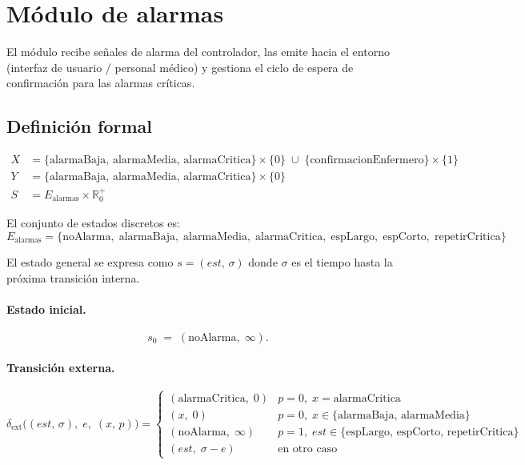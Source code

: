 \documentclass{article}
\newcommand{\dext}{\delta_{\mathrm{ext}}}
\begin{document}
\section{Módulo de alarmas}

El módulo recibe señales de alarma del controlador, las emite hacia el
entorno (interfaz de usuario / personal médico) y gestiona el ciclo de
espera de confirmación para las alarmas críticas.

\subsection{Definición formal}

\begin{align*}
  X &= \{\mathrm{alarmaBaja},\,\mathrm{alarmaMedia},\,\mathrm{alarmaCritica}\}
       \!\times\!\{0\}
     \;\cup\; \{\mathrm{confirmacionEnfermero}\}\!\times\!\{1\} \\[4pt]
  Y &= \{\mathrm{alarmaBaja},\,\mathrm{alarmaMedia},\,\mathrm{alarmaCritica}\}
       \!\times\!\{0\} \\[4pt]
  S &= E_{\mathrm{alarmas}} \times \mathbb{R}_0^+
\end{align*}

El conjunto de estados discretos es:
\[
  E_{\mathrm{alarmas}} = \{
    \mathrm{noAlarma},\;
    \mathrm{alarmaBaja},\;
    \mathrm{alarmaMedia},\;
    \mathrm{alarmaCritica},\;
    \mathrm{espLargo},\;
    \mathrm{espCorto},\;
    \mathrm{repetirCritica}
  \}
\]

El estado general se expresa como $s = (\mathit{est},\,\sigma)$ donde
$\sigma$ es el tiempo hasta la próxima transición interna.

\paragraph{Estado inicial.}
\[
  s_0 \;=\; (\mathrm{noAlarma},\;\infty).
\]

\paragraph{Transición externa.}
\[
\dext\bigl((\mathit{est},\,\sigma),\;e,\;(x,\,p)\bigr) =
\begin{cases}
  (\mathrm{alarmaCritica},\;0)
    & p=0,\;x=\mathrm{alarmaCritica} \\[4pt]
  (x,\;0)
    & p=0,\;x\in\{\mathrm{alarmaBaja},\,\mathrm{alarmaMedia}\} \\[4pt]
  (\mathrm{noAlarma},\;\infty)
    & p=1,\;\mathit{est}\in\{\mathrm{espLargo},\,\mathrm{espCorto},\,\mathrm{repetirCritica}\} \\[4pt]
  (\mathit{est},\;\sigma - e)
    & \text{en otro caso}
\end{cases}
\]
\end{document}
